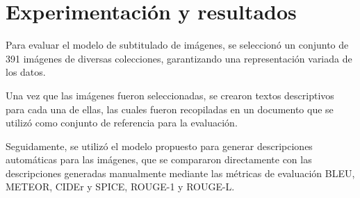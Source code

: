 \chapter{Experimentación y resultados}\label{chapter:resultados}

Para evaluar el modelo de subtitulado de imágenes, se seleccionó un conjunto de 391 imágenes de diversas colecciones, garantizando una  representación variada de los datos.

Una vez que las imágenes fueron seleccionadas, se crearon textos descriptivos para cada una de ellas, las cuales fueron recopiladas en un documento que se utilizó como conjunto de referencia para la evaluación.

Seguidamente, se utilizó el modelo propuesto para generar descripciones automáticas para las imágenes, que se compararon directamente con las descripciones generadas manualmente mediante las métricas de evaluación BLEU, METEOR, CIDEr y SPICE, ROUGE-1 y ROUGE-L.

